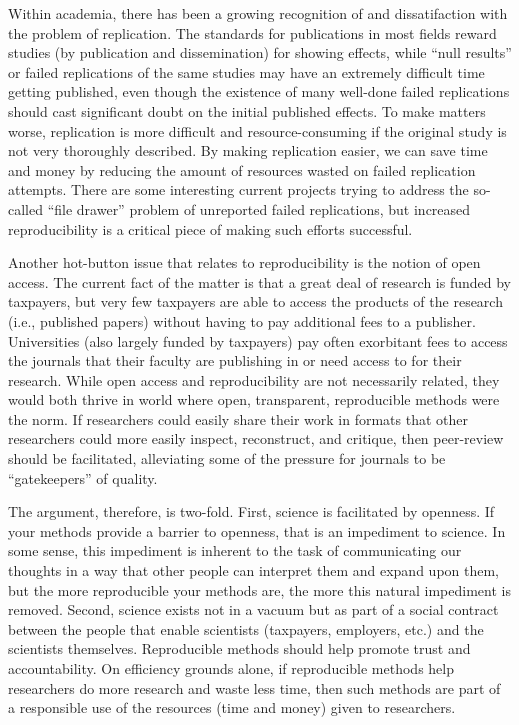 \documentclass{book}
\begin{document}
Within academia, there has been a growing recognition of and dissatifaction with the problem of replication. The standards for publications in most fields reward studies (by publication and dissemination) for showing effects, while ``null results'' or failed replications of the same studies may have an extremely difficult time getting published, even though the existence of many well-done failed replications should cast significant doubt on the initial published effects. To make matters worse, replication is more difficult and resource-consuming if the original study is not very thoroughly described. By making replication easier, we can save time and money by reducing the amount of resources wasted on failed replication attempts. There are some interesting current projects trying to address the so-called ``file drawer'' problem of unreported failed replications, but increased reproducibility is a critical piece of making such efforts successful.

Another hot-button issue that relates to reproducibility is the notion of open access. The current fact of the matter is that a great deal of research is funded by taxpayers, but very few taxpayers are able to access the products of the research (i.e., published papers) without having to pay additional fees to a publisher.  Universities (also largely funded by taxpayers) pay often exorbitant fees to access the journals that their faculty are publishing in or need access to for their research.  While open access and reproducibility are not necessarily related, they would both thrive in world where open, transparent, reproducible methods were the norm. If researchers could easily share their work in formats that other researchers could more easily inspect, reconstruct, and critique, then peer-review should be facilitated, alleviating some of the pressure for journals to be ``gatekeepers'' of quality.

The argument, therefore, is two-fold.  First, science is facilitated by openness.  If your methods provide a barrier to openness, that is an impediment to science. In some sense, this impediment is inherent to the task of communicating our thoughts in a way that other people can interpret them and expand upon them, but the more reproducible your methods are, the more this natural impediment is removed. Second, science exists not in a vacuum but as part of a social contract between the people that enable scientists (taxpayers, employers, etc.) and the scientists themselves. Reproducible methods should help promote trust and accountability. On efficiency grounds alone, if reproducible methods help researchers do more research and waste less time, then such methods are part of a responsible use of the resources (time and money) given to researchers. 
\end{document}
